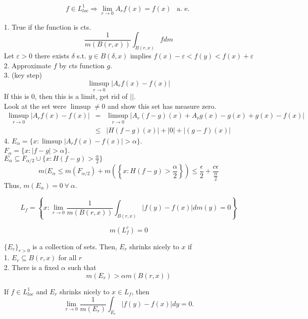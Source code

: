  \begin{thm}
$$
f \in L^1_{loc} \Rightarrow \lim_{r \rightarrow 0} A_r f(x) = f(x) \ \ \text{ a. e. }
$$
\end{thm}
\begin{pf}
1. True if the function is cts.	
\[
\frac{1}{m(B(r,x))} \int_{B(r,x)}f d m
\]
Let $\varepsilon>0$ there exists $\delta$ s.t. $y \in B( \delta, x)$ implies $f(x) - \varepsilon < f(y) < f(x) + \varepsilon$\\
2. Approximate $f$ by cts function $g$. \\
3. (key step)
\[
\limsup_{r \rightarrow 0} |A_r f(x) - f(x)|
\]
If this is 0, then this is a limit, get rid of $||$. \\
Look at the set were $\limsup \neq 0$ and show this set has measure zero.
\begin{eqnarray*}
	\limsup_{r \rightarrow 0} |A_r f(x) - f(x)| & = & \limsup_{r \rightarrow 0} |A_r (f - g)(x) + A_r g(x) - g(x) + g(x) - f(x)| \\
	& \leq & |H(f-g)(x)| + |0| + |(g-f)(x)|
\end{eqnarray*}
4. $E_{\alpha} = \{ x: \limsup |A_r f(x) - f(x)|> \alpha \}$. \\
$F_{\alpha}=\{ x : |f- g|> \alpha \}$. \\
$E_{\alpha} \subseteq F_{\alpha \slash 2} \cup \{ x: H(f-g) > \frac{\alpha}{2} \}$
$$m(E_{\alpha} \leq m(F_{\alpha \slash 2}) + m\left( \left\{ x: H(f-g) > \frac{\alpha}{2} \right\} \right) \leq \frac{\epsilon}{2} + \frac{c \epsilon}{\frac{\alpha}{2}} $$
Thus, $m(E_{\alpha}) = 0 \ \forall \ \alpha$.
\end{pf}

\begin{dfn}
\[
L_f = \left\{  x: \lim_{r \rightarrow 0} \frac{1}{m(B(r,x))} \int_{B(r,x)} |f(y) - f(x)| dm(y) = 0  \right\}
\]	
\end{dfn}

\begin{cor}
\[
m(L_f^c) = 0
\]	
\end{cor}

\begin{rmk}[notation]
$\{E_r\}_{r>0}$ is a collection of sets. Then, $E_r$ shrinks nicely to $x$ if \\
1. $E_r \subseteq B(r,x)$ for all $r$\\
2. There is a fixed $\alpha$ such that \[
m(E_r)> \alpha m(B(r,x))
\]
\end{rmk}

\begin{thm}
	If $f \in L^1_{loc}$ and $E_r$ shrinks nicely to $x \in L_f$, then
	\[
	\lim_{r \rightarrow 0} \frac{1}{m(E_r)} \int_{E_r}|f(y) - f(x)|dy = 0.
	\]
\end{thm}

